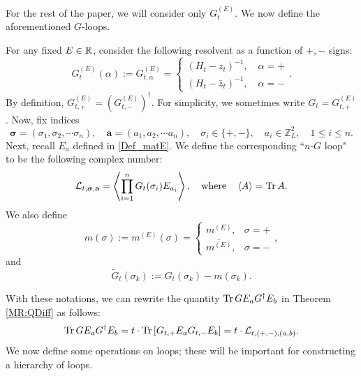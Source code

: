For the rest of the paper, we will consider only  $G_t^{(E)}$.  We now define the aforementioned $G$-loops. 
\begin{definition}\label{Def:G_loop}
 For any fixed $E\in\mathbb{R}$, consider the following resolvent as a function of $+,-$ signs:
 \begin{equation}\nonumber
  G^{(E)}_{t }(\alpha):=  G^{(E)}_{t,\alpha} =
   \begin{cases}
       (H_t-z_t)^{-1}, \quad \alpha=+\\
        (H_t-\bar z_t)^{-1}, \quad \alpha=-
   \end{cases}.
 \end{equation}
By definition, $G^{(E)}_{t,+} =\left(G^{(E)}_{t,-}\right)^\dagger$. 
For simplicity,  we sometimes write 
$G_t=G^{(E)}_{t,+}$. Now, fix indices
$$
\boldsymbol{\sigma}=(\sigma_1, \sigma_2, \cdots \sigma_n),\quad 
\boldsymbol{a}=(a_1, a_2, \cdots a_n)
,\quad \sigma_i \in \{+,-\}, \quad
a_i\in \mathbb Z_L^{2}, \quad 1\le i\le n.
$$
Next, recall $E_a$  defined in \eqref{Def_matE}. We define the corresponding ``$n$-$G$ loop" to be the following complex number: 
\begin{equation}\label{Eq:defGLoop}
    {\cal L}_{t, \boldsymbol{\sigma}, \textbf{a}}=\left\langle \prod_{i=1}^n G_t(\sigma_i) E_{a_i}\right\rangle,\quad 
\text{where} \quad \left\langle A\right\rangle=\operatorname{Tr} A.
\end{equation}
We also define 
\begin{equation}\label{def_mtzk}
m (\sigma ):=m^{(E)}(\sigma ) = \begin{cases}
     m^{(E)}, & \sigma  =+ \\
     \overline{m^{(E)}} , & \sigma = -
\end{cases},
\end{equation}
and
\begin{equation}\label{Eq:defwtG}
 \widetilde{G}_t(\sigma_k) := G_t(\sigma_k) - m (\sigma_k) .
\end{equation}
\end{definition}

With these notations, we can rewrite the quantity 
$\operatorname{Tr} G E_a G^\dagger  E_b$ in Theorem \ref{MR:QDiff} as follows:
$$
\operatorname{Tr} G E_a G^\dagger  E_b=t \cdot \operatorname{Tr} \left[G_{t,+} E_a G_{t,-} E_b\right]=t\cdot {\cal L}_{t, (+,-),(a,b)}.
$$
We now define some operations on loops; these will be important for constructing a hierarchy of loops.

